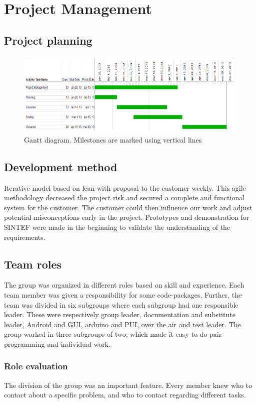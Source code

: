\section{Project Management}

\subsection{Project planning}
\begin{figure}[H]
\includegraphics[scale=0.8]{images/gantt-diagram.png}
\caption{Gantt diagram. Milestones are marked using vertical lines}
\end{figure}

\subsection{Development method}
Iterative model based on lean with proposal to the customer weekly. This agile methodology decreased the project risk and secured a complete and functional system for the customer. The customer could then influence our work and adjust potential misconceptions early in the project. Prototypes and demonstration for SINTEF were made in the beginning to validate the understanding of the requirements.

\subsection{Team roles}
The group was organized in different roles based on skill and experience. Each team member was given a responsibility for some code-packages. Further, the team was divided in six subgroups where each subgroup had one responsible leader. These were respectively group leader, documentation and substitute leader, Android and GUI, arduino and PUI, over the air and test leader. The group worked in three subgroups of two, which made it easy to do pair-programming and individual work.

\subsubsection{Role evaluation}
The division of the group was an important feature. Every member knew who to contact about a specific problem, and who to contact regarding different tasks.\\

